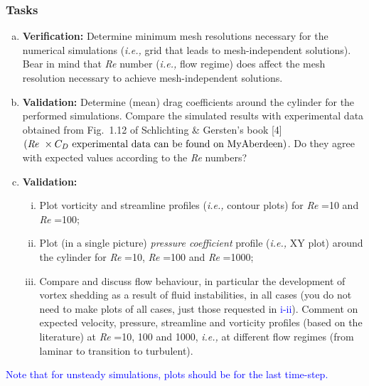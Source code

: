 \documentclass[12pts,a4paper,amsmath,amssymb,floatfix]{article}%
\newcommand{\blue}{\textcolor{blue}}
\newcommand{\ie}{{\it i.e., }}
\newcommand\Rey{\mbox{\textit{Re}}\,\,}
\begin{document}
     \begin{shaded}
       \subsubsection{Tasks}\label{FPC:Tasks}
        \begin{enumerate}[a)]
           \item {\bf Verification:} Determine minimum mesh resolutions necessary for the numerical simulations (\ie grid that leads to mesh-independent solutions). Bear in mind that \Rey number (\ie flow regime) does affect the mesh resolution necessary to achieve mesh-independent solutions.
           \item {\bf Validation:} Determine (mean) drag coefficients around the cylinder for the performed simulations. Compare the simulated results with experimental data obtained from Fig.~1.12 of Schlichting \& Gersten's book [4] $\left(\text{\Rey}\times C_{D} \text{ experimental data can be found on MyAberdeen}\right)$. Do they agree with expected values according to the \Rey numbers?
           \item {\bf Validation:}
             \begin{enumerate}[i)]
               \item\label{Task:Plot} Plot vorticity and streamline profiles (\ie contour plots) for \Rey=10 and \Rey=100;
               \item Plot (in a single picture) {\it pressure coefficient} profile (\ie XY plot) around the cylinder for \Rey=10, \Rey=100 and \Rey=1000;
               \item Compare and discuss flow behaviour, in particular the development of vortex shedding as a result of fluid instabilities, in all cases (you do not need to make plots of all cases, just those requested in \blue{i-ii}). Comment on expected velocity, pressure, streamline and vorticity profiles (based on the literature) at \Rey=10, 100 and 1000, \ie at different flow regimes (from laminar to transition to turbulent).
               \end{enumerate}
        \end{enumerate}
        \begin{center}\blue{Note that for unsteady simulations, plots should be for the last time-step.}\end{center}
     \end{shaded}
\end{document}
